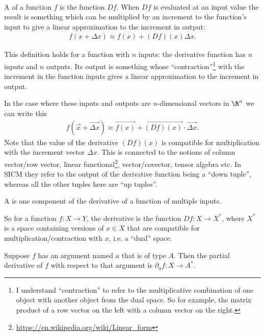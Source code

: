 \begin{definition*}~\\
  A  of a function $f$ is the function $D f$. When $D f$ is evaluated at an input
  value the result is something which can be multiplied by an increment to the function's input to
  give a linear approximation to the increment in output:
  \begin{align*}
    f(x + \Delta x) \approx f(x) + (D f)(x)\Delta x.
  \end{align*}

  This definition holds for a function with $n$ inputs: the derivative function has $n$ inputs and
  $n$ outputs. Its output is something whose ``contraction''\footnote{I understand ``contraction''
    to refer to the multiplicative combination of one object with another object from the dual
    space. So for example, the matrix product of a row vector on the left with a column vector on
    the right.} with the increment in the function inputs gives a linear approximation to the
  increment in output.

  In the case where these inputs and outputs are $n$-dimensional vectors in $\R^n$ we can write this
  \begin{align*}
    f(\overrightarrow{x} + \overrightarrow{\Delta x}) \approx \overrightarrow{f(x)} + \overrightarrow{(D f)(x)} \cdot \overrightarrow{\Delta x}.
  \end{align*}
  Note that the value of the derivative $(D f)(x)$ is compatible for multiplication with the
  increment vector $\Delta x$. This is connected to the notions of column vector/row vector, linear
  functional\footnote{\url{https://en.wikipedia.org/wiki/Linear_form}}, vector/covector, tensor
  algebra etc. In SICM they refer to the output of the derivative function being a ``down tuple'',
  whereas all the other tuples here are ``up tuples''.

  A  is one component of the derivative of a function of multiple inputs.

  So for a function $f:X \to Y$, the derivative is the function $D f:X \to X^*$, where $X^*$ is a
  space containing versions of $x \in X$ that are compatible for multiplication/contraction with
  $x$, i.e. a ``dual'' space.

  Suppose $f$ has an argument named $a$ that is of type $A$. Then the partial derivative of $f$ with
  respect to that argument is $\partial_a{f}:X \to A^*$.
\end{definition*}


